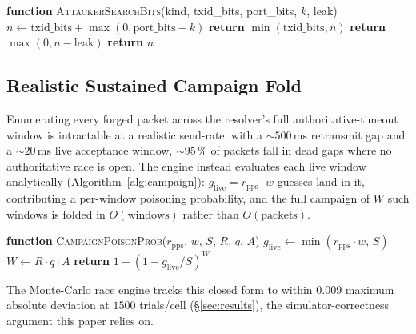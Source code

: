 \documentclass[conference]{IEEEtran}
\begin{document}
\begin{algorithm}[t]
\caption{Attacker effective search bits (per source)}
\label{alg:searchbits}
\begin{algorithmic}[1]
\STATE \textbf{function} \textsc{AttackerSearchBits}(kind, txid\_bits, port\_bits, $k$, leak)
\STATE $n \leftarrow \mathrm{txid\_bits} + \max(0, \mathrm{port\_bits} - k)$ 
  \STATE \textbf{return} $\min(\mathrm{txid\_bits}, n)$ 
  \STATE \textbf{return} $\max(0, n - \mathrm{leak})$ 
\ELSE
  \STATE \textbf{return} $n$ 
\ENDIF
\end{algorithmic}
\end{algorithm}

\subsection{Realistic Sustained Campaign Fold}

Enumerating every forged packet across the resolver's full authoritative-timeout window is intractable at
a realistic send-rate: with a $\sim\!500$\,ms retransmit gap and a $\sim\!20$\,ms live acceptance window,
$\sim\!95\,\%$ of packets fall in dead gaps where no authoritative race is open. The engine instead
evaluates each live window analytically (Algorithm~\ref{alg:campaign}): $g_{\mathrm{live}} =
r_{\mathrm{pps}} \cdot w$ guesses land in it, contributing a per-window poisoning probability, and the
full campaign of $W$ such windows is folded in $O(\mathrm{windows})$ rather than $O(\mathrm{packets})$.

\begin{algorithm}[t]
\caption{Kaminsky campaign fold (per live window, closed form)}
\label{alg:campaign}
\begin{algorithmic}[1]
\STATE \textbf{function} \textsc{CampaignPoisonProb}($r_{\mathrm{pps}}$, $w$, $S$, $R$, $q$, $A$)
\STATE $g_{\mathrm{live}} \leftarrow \min(r_{\mathrm{pps}} \cdot w,\, S)$ 
\STATE $W \leftarrow R \cdot q \cdot A$ 
\STATE \textbf{return} $1 - (1 - g_{\mathrm{live}}/S)^{W}$
\end{algorithmic}
\end{algorithm}

The Monte-Carlo race engine tracks this closed form to within $0.009$ maximum absolute deviation at
$1500$ trials/cell (\S\ref{sec:results}), the simulator-correctness argument this paper relies on.
\end{document}
